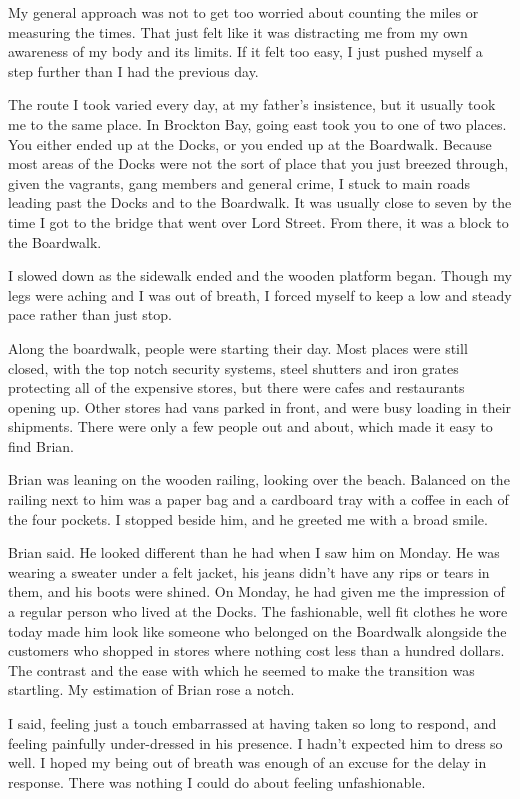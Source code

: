 My general approach was not to get too worried about counting the miles or measuring the times. That just felt like it was distracting me from my own awareness of my body and its limits. If it felt too easy, I just pushed myself a step further than I had the previous day.

The route I took varied every day, at my father's insistence, but it usually took me to the same place. In Brockton Bay, going east took you to one of two places. You either ended up at the Docks, or you ended up at the Boardwalk. Because most areas of the Docks were not the sort of place that you just breezed through, given the vagrants, gang members and general crime, I stuck to main roads leading past the Docks and to the Boardwalk. It was usually close to seven by the time I got to the bridge that went over Lord Street. From there, it was a block to the Boardwalk.

I slowed down as the sidewalk ended and the wooden platform began. Though my legs were aching and I was out of breath, I forced myself to keep a low and steady pace rather than just stop.

Along the boardwalk, people were starting their day. Most places were still closed, with the top notch security systems, steel shutters and iron grates protecting all of the expensive stores, but there were cafes and restaurants opening up. Other stores had vans parked in front, and were busy loading in their shipments. There were only a few people out and about, which made it easy to find Brian.

Brian was leaning on the wooden railing, looking over the beach. Balanced on the railing next to him was a paper bag and a cardboard tray with a coffee in each of the four pockets. I stopped beside him, and he greeted me with a broad smile.

 Brian said. He looked different than he had when I saw him on Monday. He was wearing a sweater under a felt jacket, his jeans didn't have any rips or tears in them, and his boots were shined. On Monday, he had given me the impression of a regular person who lived at the Docks. The fashionable, well fit clothes he wore today made him look like someone who belonged on the Boardwalk alongside the customers who shopped in stores where nothing cost less than a hundred dollars. The contrast and the ease with which he seemed to make the transition was startling. My estimation of Brian rose a notch.

 I said, feeling just a touch embarrassed at having taken so long to respond, and feeling painfully under-dressed in his presence. I hadn't expected him to dress so well. I hoped my being out of breath was enough of an excuse for the delay in response. There was nothing I could do about feeling unfashionable.

